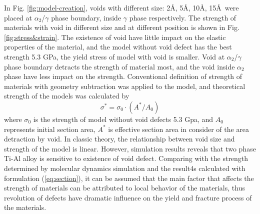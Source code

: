 \documentclass[Unknown,article,submit,moreauthors,pdftex,10pt,a4paper]{Definitions/mdpi}
\begin{document}
In Fig. \ref{fig:model-creation}, voids with different size: 2\AA, 5\AA, 10\AA, 15\AA\ were placed  at $\alpha_2$/$\gamma$ phase boundary, inside $\gamma$ phase respectively. The strength of materials with void in different size and at different position is shown in Fig.\ref{fig:stress&strain}. The existence of void have little impact on the elastic properties of the material, and the model without void defect has the best strength 5.3 GPa, the yield stress of model with void is smaller. Void at $\alpha_2$/$\gamma$ phase boundary  detracts the strength of  material most, and the void inside $\alpha_2$ phase  have less impact on the strength.          
Conventional definition of strength of materials with geometry subtraction was applied to the model, and theoretical strength of the models was calculated by
\begin{equation} \label{eq:section} 
\sigma^* = \sigma_0 \cdot({A^*}/{A_0})
\end{equation}
where $\sigma_0$ is the strength of model without void defects 5.3 Gpa, and $A_0$ represents initial section area,  $A^*$ is effective section area in consider of the area detraction by void.  In classic theory, the relationship between void size and strength of the model is linear. However, simulation results reveals that two phase Ti-Al alloy is sensitive to existence of void defect.  Comparing with the strength determined by molecular dynamics simulation and the result4s calculated with formulation (\ref{eq:section}), it can be assumed that the main factor that affects the strength of materials can be attributed to local behavior of the materials, thus revolution of defects have dramatic influence on the yield and fracture process of the materials.
\end{document}
